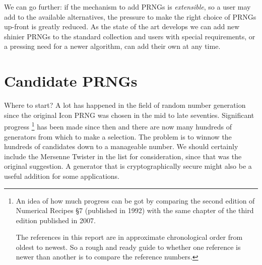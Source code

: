 \documentclass[letterpaper,12pt]{article}
\begin{document}
We can go further: if the mechanism to add PRNGs is {\em extensible}, so a
user may add to the available alternatives, the pressure to make the right
choice of PRNGs up-front is greatly reduced. As the state of the art
develops we can add new shinier PRNGs to the standard collection and users
with special requirements, or a pressing need for a newer algorithm, can
add their own at any time.

\section{Candidate PRNGs}
Where to start? A lot has happened in the field of random number generation
since the original Icon PRNG was chosen in the mid to late seventies.
Significant progress%
\footnote{
  An idea of how much progress can be got by comparing the second edition
  of Numerical Recipes \cite{PressEtAl:numericalRecipes-2} \S 7 (published
  in 1992) with the same chapter of the third edition
  \cite{PressEtAl:numericalRecipes} published in 2007.

  The references in this report are in approximate chronological order from
  oldest to newest. So a rough and ready guide to whether one reference is
  newer than another is to compare the reference numbers.
}
has been made since then and there are now many hundreds of generators from
which to make a selection. The problem is to winnow the hundreds of
candidates down to a manageable number. We should certainly include the
Mersenne Twister in the list for consideration, since that was the original
suggestion. A generator that is cryptographically secure might also be a
useful addition for some applications. 
\end{document}
